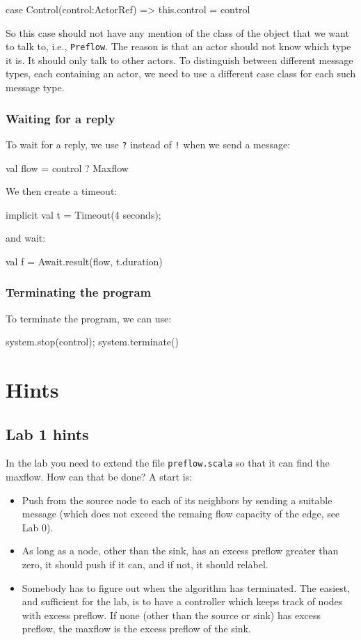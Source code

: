 \documentclass{forsete}
\begin{document}
\begin{ccode}
case Control(control:ActorRef)	=> this.control = control
\end{ccode}
So this case should not have any mention of the class of the object that we want to talk to, i.e., {\tt Preflow}.
The reason is that an actor should not know which type it is. It should only talk to other actors.
To distinguish between different message types, each containing an actor, we need to use a 
different case class for each such message type.

\subsubsection*{Waiting for a reply}
To wait for a reply, we use \verb.?. instead of \verb.!. when we send a message:

\begin{ccode}
val flow = control ? Maxflow
\end{ccode}
We then create a timeout:
\begin{ccode}
implicit val t = Timeout(4 seconds);
\end{ccode}
and wait:
\begin{ccode}
val f = Await.result(flow, t.duration)
\end{ccode}
\subsubsection*{Terminating the program}
To terminate the program, we can use:
\begin{ccode}
system.stop(control);
system.terminate()
\end{ccode}

\section{Hints}
\subsection*{Lab 1 hints}
In the lab you need to extend the file \verb!preflow.scala! so that it can find the maxflow.
How can that be done? A start is:

\begin{itemize}
\item Push from the source node to each of its neighbors by sending a suitable message (which does not exceed
the remaing flow capacity of the edge, see Lab 0).
\item As long as a node, other than the sink, has an excess preflow greater than zero, it should 
push if it can, and if not, it should relabel.
\item Somebody has to figure out when the algorithm has terminated. The easiest, and sufficient for the lab,
is to have a controller which keeps track of nodes with excess preflow. If none (other than the source or sink)
has excess preflow, the maxflow is the excess preflow of the sink.
\end{itemize}
\end{document}
